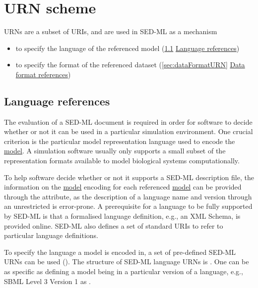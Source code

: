 \section{URN scheme}  
\label{sec:urnScheme}
URNs are a subset of URIs, and are used in SED-ML as a mechanism
\begin{itemize}
	\item to specify the language of the referenced model (\ref{sec:languageURN} \hyperref[sec:languageURN]{Language references})
	\item to specify the format of the referenced dataset (\ref{sec:dataFormatURN} \hyperref[sec:dataFormatURN]{Data format references})
\end{itemize}

\subsection{Language references}
\label{sec:languageURN}
The evaluation of a SED-ML document is required in order for software to decide whether or not it can be used in a particular simulation environment. One crucial criterion is the particular model representation language used to encode the \hyperref[class:model]{model}. A simulation software usually only supports a small subset of the representation formats available to model biological systems computationally. 

To help  software decide whether or not it supports a SED-ML description file, the information on the \hyperref[class:model]{model} encoding for each referenced \hyperref[class:model]{model} can be provided through the \hyperref[sec:language]{} attribute, as the description of a language name and version through an unrestricted  is error-prone. 
A prerequisite for a language to be fully supported by SED-ML is that a formalised language definition, e.g., an XML Schema, is provided online. SED-ML also defines a set of standard URIs to refer to particular language definitions. 

To specify the language a model is encoded in, a set of pre-defined SED-ML URNs can be used (). The structure of SED-ML language URNs is \emph{}. One can be as specific as defining a model being in a particular version of a language, e.g., SBML Level 3 Version 1 as .

